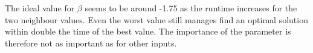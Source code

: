 The ideal value for $\beta$ seems to be around -1.75 as the runtime increases for the two neighbour values.
Even the worst value still manages find an optimal solution within double the time of the best value.
The importance of the parameter is therefore not as important as for other inputs.